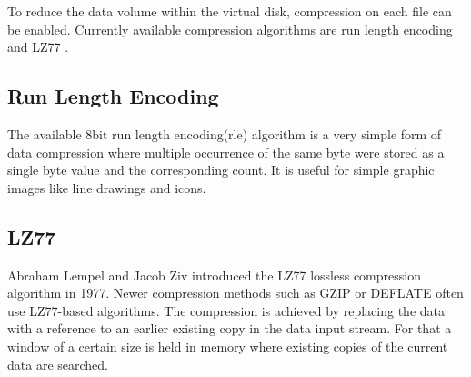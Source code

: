 To reduce the data volume within the virtual disk, compression on each file can
be enabled. Currently available compression algorithms are run length encoding
\cite{rle} and LZ77 \cite{lz77}.

\subsection{Run Length Encoding}

The available 8bit run length encoding(rle) algorithm is a very simple form of
data compression where multiple occurrence of the same byte were stored as a
single byte value and the corresponding count. It is useful for simple graphic
images like line drawings and icons.

\subsection{LZ77}

Abraham Lempel and Jacob Ziv introduced the LZ77 lossless compression algorithm
in 1977. Newer compression methods such as GZIP or DEFLATE often use LZ77-based
algorithms. The compression is achieved by replacing the data with a reference
to an earlier existing copy in the data input stream. For that a window of
a certain size is held in memory where existing copies of the current data are
searched.
